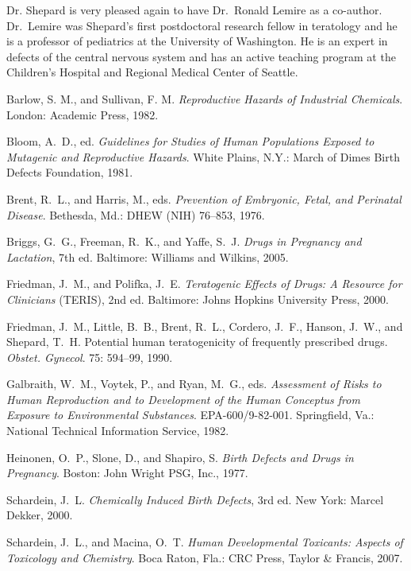 Dr. Shepard is very pleased again to have Dr.~Ronald Lemire as a co-author.
Dr.~Lemire was Shepard's first postdoctoral research fellow in
teratology and he is a professor of pediatrics at the University 
of Washington.  He is an expert in defects of the central nervous 
system and has an active teaching program at the Children's Hospital
and Regional Medical Center of Seattle.

\begin{references}

\item Barlow, S. M., and Sullivan, F. M. {\it Reproductive Hazards of
Industrial Chemicals}. London: Academic Press, 1982.
\item Bloom, A.~D., ed. {\it Guidelines for Studies of Human Populations
Exposed to Mutagenic and Reproductive Hazards}. White Plains, N.Y.:
March of Dimes Birth Defects Foundation, 1981.
\item Brent, R.~L., and Harris, M., eds. {\it Prevention of Embryonic,
Fetal, and Perinatal Disease}. Bethesda,
Md.: DHEW (NIH) 76--853, 1976.
\item Briggs, G.~G., Freeman, R.~K., and Yaffe, S.~J. {\it Drugs in
Pregnancy and Lactation}, 7th ed. Baltimore:
Williams and Wilkins, 2005.
\item Friedman, J.~M., and Polifka, J.~E. {\it Teratogenic Effects of
Drugs: A Resource for Clinicians} (TERIS), 2nd ed. Baltimore:
Johns Hopkins University Press, 2000.
\item Friedman, J.~M., Little, B.~B., Brent, R.~L., Cordero, J.~F., Hanson,
J.~W., and Shepard, T.~H. Potential
human teratogenicity of frequently prescribed drugs.
{\it Obstet. Gynecol}. 75: 594--99, 1990.
\item Galbraith, W.~M., Voytek, P., and Ryan, M.~G., eds.
{\it Assessment of Risks to Human Reproduction
and to Development of the Human Conceptus from Exposure to
Environmental Substances}.
EPA-600/9-82-001.
Springfield, Va.: National Technical Information Service, 1982.
\item Heinonen, O.~P., Slone, D., and Shapiro, S. {\it Birth Defects and
Drugs in Pregnancy}. Boston:
John Wright PSG, Inc., 1977.
\item Schardein, J.~L. {\it Chemically Induced Birth Defects}, 3rd ed.
New York:
Marcel Dekker, 2000.
\item Schardein, J.~L., and Macina, O.~T. {\it Human Developmental Toxicants:
Aspects of Toxicology and Chemistry}. 
Boca Raton, Fla.: CRC Press, Taylor \& Francis, 2007. 


\end{references}
